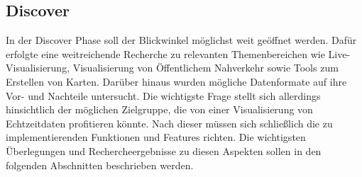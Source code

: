 \begin{newpage}
  \section{Discover}
  \label{sec:discover}
    In der Discover Phase soll der Blickwinkel möglichst weit geöffnet werden.
    Dafür erfolgte eine weitreichende Recherche zu relevanten Themenbereichen wie Live-Visualisierung, Visualisierung von Öffentlichem Nahverkehr sowie Tools zum Erstellen von Karten. Darüber hinaus wurden mögliche Datenformate auf ihre Vor- und Nachteile untersucht. Die wichtigste Frage stellt sich allerdings hinsichtlich der möglichen Zielgruppe, die von einer Visualisierung von Echtzeitdaten profitieren könnte. Nach dieser müssen sich schließlich die zu implementierenden Funktionen und Features richten. Die wichtigsten Überlegungen und Rechercheergebnisse zu diesen Aspekten sollen in den folgenden Abschnitten beschrieben werden.

    
    
    

\end{newpage}